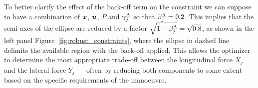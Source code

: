 To better clarify the effect of the back-off term on the constraint we can suppose to have a combination of $\boldsymbol{x}$, $\boldsymbol{u}$, $P$ and $\gamma^\textrm{A}_j$ so that $\beta^\textrm{A}_j=0.2$. This implies that the semi-axes of the ellipse are reduced by a factor $\sqrt{1-\beta^\textrm{A}_j} = \sqrt{0.8}$, as shown in the left panel Figure~\ref{fig:robust_constraints}, where the ellipse in dashed line delimits the available region with the back-off applied. This allows the optimizer to determine the most appropriate trade-off between the longitudinal force $X_j$ and the lateral force $Y_j$ --- often by reducing both components to some extent --- based on the specific requirements of the manoeuvre.


